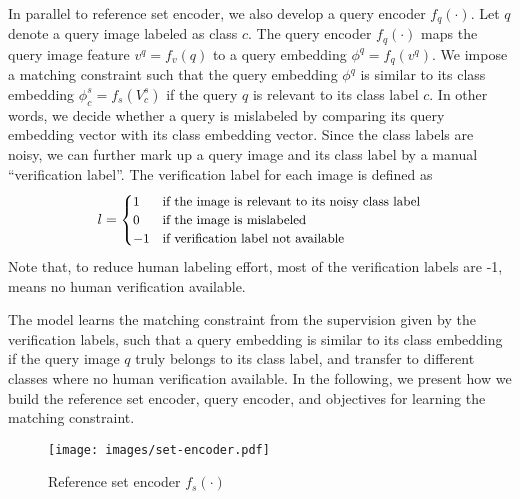 \documentclass[10pt,twocolumn,letterpaper]{article}
\begin{document}
In parallel to reference set encoder, we also develop a query encoder $f_q(\cdot)$. Let $q$ denote a query image labeled as class $c$. The query encoder $f_q(\cdot)$ maps the query image feature $v^q = f_v(q)$ to a query embedding $\phi^q = f_q(v^q)$. We impose a matching constraint such that the query embedding $\phi^q$ is similar to its class embedding $\phi_c^s = f_s(V_c^s)$ if the query $q$ is relevant to its class label $c$. In other words, we decide whether a query is mislabeled by comparing its query embedding vector with its class embedding vector. Since the class labels are noisy, we can further mark up a query image and its class label by a manual ``verification label''. The verification label for each image is defined as 
\begin{equation}
\small
l = 
\begin{cases}
    1& \text{if the image is relevant to its noisy class label}\\
    0& \text{if the image is mislabeled}\\
    -1 & \text{if verification label not available}
\end{cases}
\end{equation}
Note that, to reduce human labeling effort, most of the verification labels are -1, means no human verification available.

The model learns the matching constraint from the supervision given by the verification labels, such that a query embedding is similar to its class embedding if the query image $q$ truly belongs to its class label, and transfer to different classes where no human verification available. In the following, we present how we build the reference set encoder, query encoder, and objectives for learning the matching constraint.

\begin{figure}[t]
\begin{center}
\texttt{[image: images/set-encoder.pdf]}
\end{center}
\vspace{-3mm}
\caption{Reference set encoder $f_s(\cdot)$}
\label{fig:set_encoder}
\end{figure}
\end{document}
